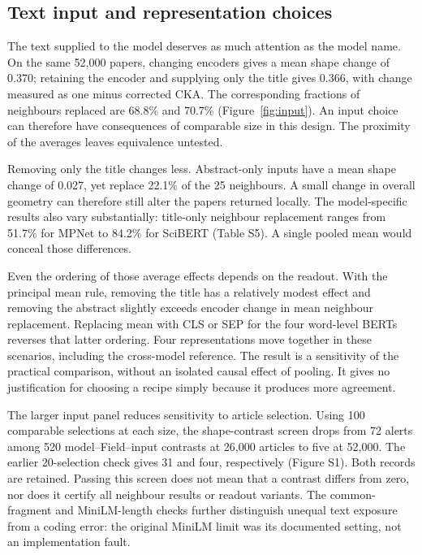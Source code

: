 \documentclass[12pt]{article}
\begin{document}
\subsection{Text input and representation choices}
The text supplied to the model deserves as much attention as the model name. On the same 52,000 papers, changing encoders gives a mean shape change of 0.370; retaining the encoder and supplying only the title gives 0.366, with change measured as one minus corrected CKA. The corresponding fractions of neighbours replaced are 68.8\% and 70.7\% (Figure~\ref{fig:input}). An input choice can therefore have consequences of comparable size in this design. The proximity of the averages leaves equivalence untested.


Removing only the title changes less. Abstract-only inputs have a mean shape change of 0.027, yet replace 22.1\% of the 25 neighbours. A small change in overall geometry can therefore still alter the papers returned locally. The model-specific results also vary substantially: title-only neighbour replacement ranges from 51.7\% for MPNet to 84.2\% for SciBERT (Table S5). A single pooled mean would conceal those differences.

Even the ordering of those average effects depends on the readout. With the principal mean rule, removing the title has a relatively modest effect and removing the abstract slightly exceeds encoder change in mean neighbour replacement. Replacing mean with CLS or SEP for the four word-level BERTs reverses that latter ordering. Four representations move together in these scenarios, including the cross-model reference. The result is a sensitivity of the practical comparison, without an isolated causal effect of pooling. It gives no justification for choosing a recipe simply because it produces more agreement.

The larger input panel reduces sensitivity to article selection. Using 100 comparable selections at each size, the shape-contrast screen drops from 72 alerts among 520 model--Field--input contrasts at 26,000 articles to five at 52,000. The earlier 20-selection check gives 31 and four, respectively (Figure S1). Both records are retained. Passing this screen does not mean that a contrast differs from zero, nor does it certify all neighbour results or readout variants. The common-fragment and MiniLM-length checks further distinguish unequal text exposure from a coding error: the original MiniLM limit was its documented setting, not an implementation fault.
\end{document}
